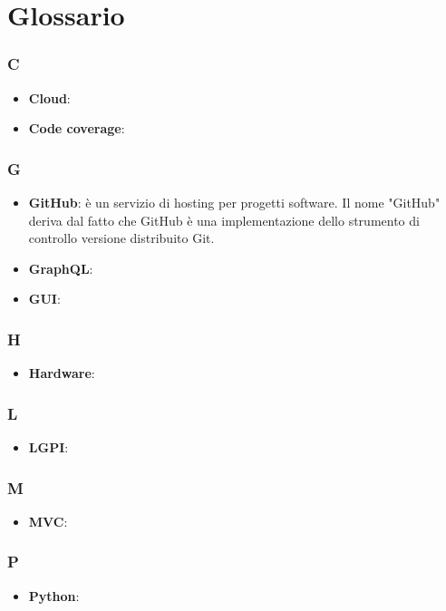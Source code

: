 \appendix

\section{Glossario}

\subsubsection{C}
\begin{itemize}
	\item \textbf{Cloud}:
	\item \textbf{Code coverage}:
\end{itemize}

\subsubsection{G}
\begin{itemize}
	\item \textbf{GitHub}: è un servizio di hosting per progetti software. Il nome "GitHub" deriva dal fatto che
GitHub è una implementazione dello strumento di controllo versione distribuito Git.
\item \textbf{GraphQL}:
\item \textbf{GUI}:
\end{itemize}

\subsubsection{H}
\begin{itemize}
	\item \textbf{Hardware}:
\end{itemize}

\subsubsection{L}
\begin{itemize}
\item \textbf{LGPI}:
\end{itemize}

\subsubsection{M}
\begin{itemize}
\item \textbf{MVC}:
\end{itemize}

\subsubsection{P}
\begin{itemize}
	\item \textbf{Python}:
\end{itemize}

